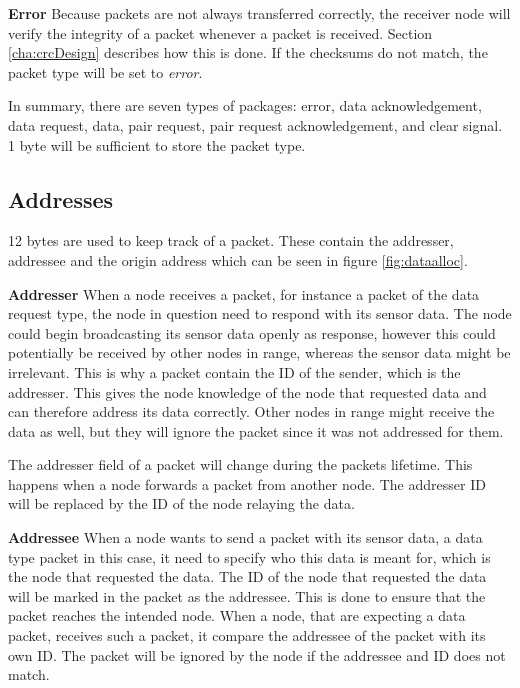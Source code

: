 \textbf{Error}\newline
Because packets are not always transferred correctly, the receiver node will verify the integrity of a packet whenever a packet is received. Section \ref{cha:crcDesign} describes how this is done. If the checksums do not match, the packet type will be set to \textit{error}.

In summary, there are seven types of packages: error, data acknowledgement, data request, data, pair request, pair request acknowledgement, and clear signal. 1 byte will be sufficient to store the packet type.



\subsection{Addresses}
12 bytes are used to keep track of a packet. These contain the addresser, addressee and the origin address which can be seen in figure \ref{fig:dataalloc}. 

\textbf{Addresser}\newline
When a node receives a packet, for instance a packet of the data request type, the node in question need to respond with its sensor data. The node could begin broadcasting its sensor data openly as response, however this could potentially be received by other nodes in range, whereas the sensor data might be irrelevant. This is why a packet contain the ID of the sender, which is the addresser. This gives the node knowledge of the node that requested data and can therefore address its data correctly. Other nodes in range might receive the data as well, but they will ignore the packet since it was not addressed for them.

The addresser field of a packet will change during the packets lifetime. This happens when a node forwards a packet from another node. The addresser ID will be replaced by the ID of the node relaying the data.

\textbf{Addressee}\newline
When a node wants to send a packet with its sensor data, a data type packet in this case, it need to specify who this data is meant for, which is the node that requested the data. The ID of the node that requested the data will be marked in the packet as the addressee. This is done to ensure that the packet reaches the intended node. When a node, that are expecting a data packet, receives such a packet, it compare the addressee of the packet with its own ID. The packet will be ignored by the node if the addressee and ID does not match.


